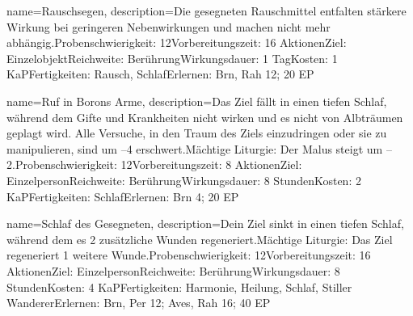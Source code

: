 {
    name={Rauschsegen},
    description={Die gesegneten Rauschmittel entfalten stärkere Wirkung bei geringeren Nebenwirkungen und machen nicht mehr abhängig.\newline Probenschwierigkeit: 12\newline Vorbereitungszeit: 16 Aktionen\newline Ziel: Einzelobjekt\newline Reichweite: Berührung\newline Wirkungsdauer: 1 Tag\newline Kosten: 1 KaP\newline Fertigkeiten: Rausch, Schlaf\newline Erlernen: Brn, Rah 12; 20 EP}
}


{
    name={Ruf in Borons Arme},
    description={Das Ziel fällt in einen tiefen Schlaf, während dem Gifte und Krankheiten nicht wirken und es nicht von Albträumen geplagt wird. Alle Versuche, in den Traum des Ziels einzudringen oder sie zu manipulieren, sind um –4 erschwert.\newline Mächtige Liturgie: Der Malus steigt um –2.\newline Probenschwierigkeit: 12\newline Vorbereitungszeit: 8 Aktionen\newline Ziel: Einzelperson\newline Reichweite: Berührung\newline Wirkungsdauer: 8 Stunden\newline Kosten: 2 KaP\newline Fertigkeiten: Schlaf\newline Erlernen: Brn 4; 20 EP}
}


{
    name={Schlaf des Gesegneten},
    description={Dein Ziel sinkt in einen tiefen Schlaf, während dem es 2 zusätzliche Wunden regeneriert.\newline Mächtige Liturgie: Das Ziel regeneriert 1 weitere Wunde.\newline Probenschwierigkeit: 12\newline Vorbereitungszeit: 16 Aktionen\newline Ziel: Einzelperson\newline Reichweite: Berührung\newline Wirkungsdauer: 8 Stunden\newline Kosten: 4 KaP\newline Fertigkeiten: Harmonie, Heilung, Schlaf, Stiller Wanderer\newline Erlernen: Brn, Per 12; Aves, Rah 16; 40 EP}
}



